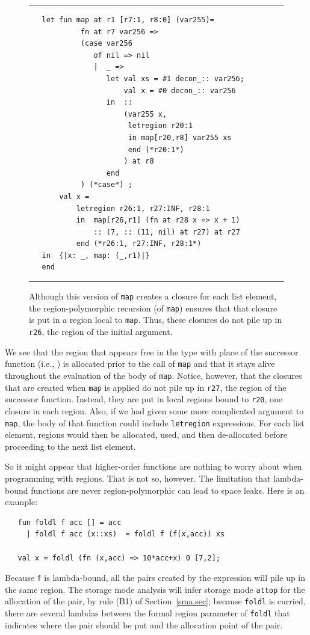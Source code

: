 \documentclass[12pt]{book}
\begin{document}
\begin{figure}
\hrule \medskip
\begin{verbatim}
   let fun map at r1 [r7:1, r8:0] (var255)= 
            fn at r7 var256 => 
            (case var256 
               of nil => nil
               |  _ => 
                  let val xs = #1 decon_:: var256; 
                      val x = #0 decon_:: var256
                  in  :: 
                      (var255 x, 
                       letregion r20:1 
                       in map[r20,r8] var255 xs 
                       end (*r20:1*)
                      ) at r8
                  end 
            ) (*case*) ; 
       val x = 
           letregion r26:1, r27:INF, r28:1 
           in  map[r26,r1] (fn at r28 x => x + 1) 
               :: (7, :: (11, nil) at r27) at r27 
           end (*r26:1, r27:INF, r28:1*)
   in  {|x: _, map: (_,r1)|}
   end 
\end{verbatim}
\caption{Although this version of {\tt map} creates a closure for
  each list element, the region-polymorphic recursion (of {\tt map})
  ensures that that closure is put in a region local to {\tt map}.
  Thus, these closures do not pile up in {\tt r26}, the region of the
  initial argument.} 
\medskip \hrule
\label{map.fig}
\end{figure}
We see that the region that appears free in the type with place of the
successor function (i.e., ) is allocated prior to the call
of {\tt map} and that it stays alive throughout the evaluation of the
body of {\tt map}. Notice, however, that the closures that are created
when {\tt map} is applied do not pile up in {\tt r27}, the region of
the successor function. Instead, they are put in local regions bound
to {\tt r20}, one closure in each region.  Also, if we had given some
more complicated argument to {\tt map}, the body of that function
could include {\tt letregion} expressions. For each list element,
regions would then be allocated, used, and then de-allocated before
proceeding to the next list element.

So it might appear that higher-order functions are nothing to worry
about when programming with regions. That is not so, however. The
limitation that lambda-bound functions are never region-polymorphic
can lead to space leaks. Here is an example:
\begin{verbatim}
   fun foldl f acc [] = acc
     | foldl f acc (x::xs)  = foldl f (f(x,acc)) xs

   val x = foldl (fn (x,acc) => 10*acc+x) 0 [7,2];
\end{verbatim}
Because {\tt f} is lambda-bound, all the pairs created by the
expression  will pile up in the same region. The
storage mode analysis will infer storage mode {\tt attop} for the
allocation of the pair, by rule (B1) of Section~\ref{sma.sec}; because
{\tt foldl} is curried, there are several lambdas between the formal
region parameter of {\tt foldl} that indicates where the pair should
be put and the allocation point of the pair.
\end{document}

